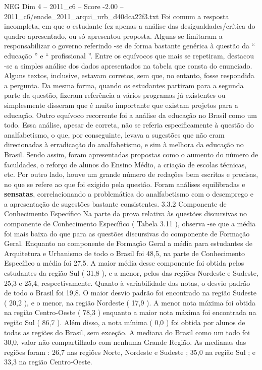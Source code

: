 \begin{textsample}{NEG Dim 4 – 2011\_c6 – Score -2.00 – 2011\_c6/enade\_2011\_arqui\_urb\_d40dca22f3.txt}
Foi comum a resposta incompleta, em que o estudante fez apenas a análise das desigualdades/crítica do quadro apresentado, ou só apresentou proposta.
Alguns se limitaram a responsabilizar o governo referindo -se de forma bastante genérica à questão da “ educação ” e “ profissional ”.
Entre os equívocos que mais se repetiram, destacou -se a simples análise dos dados apresentados na tabela que consta do enunciado.
Alguns textos, inclusive, estavam corretos, sem que, no entanto, fosse respondida a pergunta.
Da mesma forma, quando os estudantes partiram para a segunda parte da questão, fizeram referência a vários programas já existentes ou simplesmente disseram que é muito importante que existam projetos para a educação.
Outro equívoco recorrente foi a análise da educação no Brasil como um todo.
Essa análise, apesar de correta, não se referia especificamente à questão do analfabetismo, o que, por conseguinte, levava a sugestões que não eram direcionadas à erradicação do analfabetismo, e sim à melhora da educação no Brasil.
Sendo assim, foram apresentadas propostas como o aumento do número de faculdades, o reforço de alunos do Ensino Médio, a criação de escolas técnicas, etc.
Por outro lado, houve um grande número de redações bem escritas e precisas, no que se refere ao que foi exigido pela questão.
Foram análises equilibradas e \textbf{sensatas}, correlacionando a problemática do analfabetismo com o desemprego e a apresentação de sugestões bastante consistentes. 3.3.2 Componente de Conhecimento Específico Na parte da prova relativa às questões discursivas no componente de Conhecimento Específico ( Tabela 3.11 ), observa -se que a média foi mais baixa do que para as questões discursivas do componente de Formação Geral.
Enquanto no componente de Formação Geral a média para estudantes de Arquitetura e Urbanismo de todo o Brasil foi 48,5, na parte de Conhecimento Específico a média foi 27,5.
A maior média desse componente foi obtida pelos estudantes da região Sul ( 31,8 ), e a menor, pelos das regiões Nordeste e Sudeste, 25,3 e 25,4, respectivamente.
Quanto à variabilidade das notas, o desvio padrão de todo o Brasil foi 19,8.
O maior desvio padrão foi encontrado na região Sudeste ( 20,2 ), e o menor, na região Nordeste ( 17,9 ).
A menor nota máxima foi obtida na região Centro-Oeste ( 78,3 ) enquanto a maior nota máxima foi encontrada na região Sul ( 86,7 ).
Além disso, a nota mínima ( 0,0 ) foi obtida por alunos de todas as regiões do Brasil, sem exceção.
A mediana do Brasil como um todo foi 30,0, valor não compartilhado com nenhuma Grande Região.
As medianas das regiões foram : 26,7 nas regiões Norte, Nordeste e Sudeste ; 35,0 na região Sul ; e 33,3 na região Centro-Oeste.

\end{textsample}
